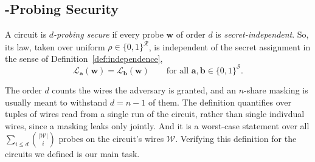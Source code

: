   \subsection{-Probing Security}
  \label{sec:d-probing}

  \begin{definition}
  \label{def:d-probing}
  A circuit is \emph{$d$-probing secure} if every probe $\mathbf{w}$ of order $d$
  is \emph{secret-independent}. So, its law, taken over uniform
  $\rho \in \{0,1\}^{\mathcal{R}}$, is independent of the secret assignment in the
  sense of Definition~\ref{def:independence},
  \[
    \mathcal{L}_{\mathbf{a}}(\mathbf{w}) = \mathcal{L}_{\mathbf{b}}(\mathbf{w})
    \qquad \text{for all } \mathbf{a}, \mathbf{b} \in \{0,1\}^{\mathcal{S}} .
  \]
  \end{definition}

  The order $d$ counts the wires the adversary is granted, and an $n$-share
  masking is usually meant to withstand $d = n-1$ of them. The definition
  quantifies over tuples of wires read from a single run of the circuit, rather than single indivdual wires,
  since a masking leaks only jointly. And it is a worst-case statement over all
  $\sum_{i \le d} \binom{|\mathcal{W}|}{i}$ probes on the circuit's wires
  $\mathcal{W}$. Verifying this definition for the circuits we defined is our main
  task.




